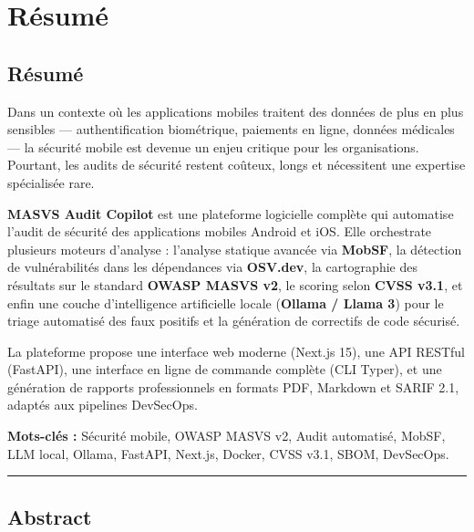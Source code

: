 \chapter*{Résumé}
\thispagestyle{fancy}

\section*{\textcolor{PrimaryBlue}{Résumé}}

Dans un contexte où les applications mobiles traitent des données de plus en plus
sensibles --- authentification biométrique, paiements en ligne, données médicales ---
la sécurité mobile est devenue un enjeu critique pour les organisations.
Pourtant, les audits de sécurité restent coûteux, longs et nécessitent une expertise
spécialisée rare.

\textbf{MASVS Audit Copilot} est une plateforme logicielle complète qui automatise
l'audit de sécurité des applications mobiles Android et iOS. Elle orchestrate plusieurs
moteurs d'analyse : l'analyse statique avancée via \textbf{MobSF}, la détection de
vulnérabilités dans les dépendances via \textbf{OSV.dev}, la cartographie des résultats
sur le standard \textbf{OWASP MASVS v2}, le scoring selon \textbf{CVSS v3.1}, et enfin
une couche d'intelligence artificielle locale (\textbf{Ollama / Llama 3}) pour le
triage automatisé des faux positifs et la génération de correctifs de code sécurisé.

La plateforme propose une interface web moderne (Next.js 15), une API RESTful
(FastAPI), une interface en ligne de commande complète (CLI Typer), et une génération
de rapports professionnels en formats PDF, Markdown et SARIF 2.1, adaptés aux
pipelines DevSecOps.

\begin{tcolorbox}[infobox]
  \textbf{Mots-clés :} Sécurité mobile, OWASP MASVS v2, Audit automatisé, MobSF,
  LLM local, Ollama, FastAPI, Next.js, Docker, CVSS v3.1, SBOM, DevSecOps.
\end{tcolorbox}

\vspace{1.5cm}
\rule{\linewidth}{0.4pt}
\vspace{0.5cm}

\section*{\textcolor{PrimaryBlue}{Abstract}}

